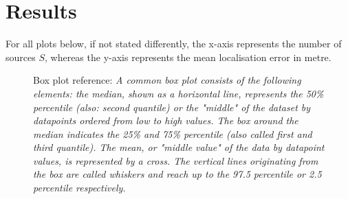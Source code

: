 \newlength\figureheight \setlength\figureheight{8cm}
\newlength\figurewidth  \setlength\figurewidth{8cm}


\chapter{Results}
\label{chap:results}

For all plots below, if not stated differently, the x-axis represents the number of sources $S$, whereas the y-axis represents the mean localisation error in metre.

\newcommand{\boxplotDescription}{Mean Localisation Error across Number of Sources $S$\ }

\begin{figure}[H]
    \setlength\figureheight{7cm}
    \small
    \setlength\figurewidth{5cm}
	\centering
	
	\caption[Box plot reference]{Box plot reference: \itshape A common box plot consists of the following elements: the median, shown as a horizontal line, represents the 50\% percentile (also: second quantile) or the "middle" of the dataset by datapoints ordered from low to high values. The box around the median indicates the 25\% and 75\% percentile (also called first and third quantile). The mean, or "middle value" of the data by datapoint values, is represented by a cross. The vertical lines originating from the box are called whiskers and reach up to the 97.5 percentile or 2.5 percentile respectively.}
	\label{fig:boxplot-reference}
\end{figure}


